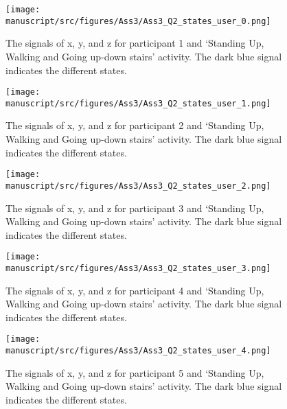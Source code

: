 \begin{figure}[H]
    \centering
    \begin{minipage}[b]{1\textwidth}
        \texttt{[image: manuscript/src/figures/Ass3/Ass3\_Q2\_states\_user\_0.png]}
    \end{minipage}
    \caption{The signals of x, y, and z for participant 1 and ‘Standing  Up,  Walking  and  Going  up-down  stairs’ activity. The dark blue signal indicates the different states.}
    \label{fig:Ass3_Q2_states_user_0}
\end{figure}
\begin{figure}[H]
    \centering
    \begin{minipage}[b]{1\textwidth}
        \texttt{[image: manuscript/src/figures/Ass3/Ass3\_Q2\_states\_user\_1.png]}
    \end{minipage}
    \caption{The signals of x, y, and z for participant 2 and ‘Standing  Up,  Walking  and  Going  up-down  stairs’ activity. The dark blue signal indicates the different states.}
    \label{fig:Ass3_Q2_states_user_1}
\end{figure}
\begin{figure}[H]
    \centering
    \begin{minipage}[b]{1\textwidth}
        \texttt{[image: manuscript/src/figures/Ass3/Ass3\_Q2\_states\_user\_2.png]}
    \end{minipage}
    \caption{The signals of x, y, and z for participant 3 and ‘Standing  Up,  Walking  and  Going  up-down  stairs’ activity. The dark blue signal indicates the different states.}
    \label{fig:Ass3_Q2_states_user_2}
\end{figure}
\begin{figure}[H]
    \centering
    \begin{minipage}[b]{1\textwidth}
        \texttt{[image: manuscript/src/figures/Ass3/Ass3\_Q2\_states\_user\_3.png]}
    \end{minipage}
    \caption{The signals of x, y, and z for participant 4 and ‘Standing  Up,  Walking  and  Going  up-down  stairs’ activity. The dark blue signal indicates the different states.}
    \label{fig:Ass3_Q2_states_user_3}
\end{figure}
\begin{figure}[H]
    \centering
    \begin{minipage}[b]{1\textwidth}
        \texttt{[image: manuscript/src/figures/Ass3/Ass3\_Q2\_states\_user\_4.png]}
    \end{minipage}
    \caption{The signals of x, y, and z for participant 5 and ‘Standing  Up,  Walking  and  Going  up-down  stairs’ activity. The dark blue signal indicates the different states.}
    \label{fig:Ass3_Q2_states_user_4}
\end{figure}
